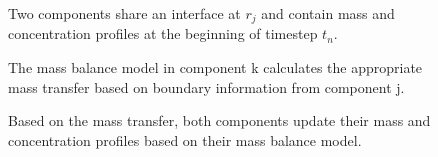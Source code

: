 

\begin{figure}[htbp!]
  \begin{center}
    \def\svgwidth{.4\textwidth}
    
  \end{center}
  \caption{Two components share an interface at $r_j$ and contain mass and
  concentration profiles at the beginning of timestep $t_n$.}
  \label{fig:vols}
\end{figure}

\begin{figure}[htbp!]
  \begin{center}
    \def\svgwidth{.4\textwidth}
    
  \end{center}
  \caption{The mass balance model in component k calculates the appropriate
  mass transfer based on boundary information from component j.}
  \label{fig:vols_trans}
\end{figure}

\begin{figure}[htbp!]
  \begin{center}
    \def\svgwidth{.4\textwidth}
    
  \end{center}
  \caption{Based on the mass transfer, both components update their mass and
  concentration profiles based on their mass balance model.}
  \label{fig:vols_update}
\end{figure}

